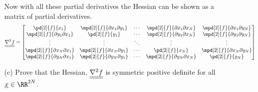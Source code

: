 \documentclass[11pt, oneside]{article}
\begin{document}
\begin{enumerate}
\begin{enumerate}
        Now with all these partial derivatives the Hessian can be shown as a
        matrix of partial derivatives.
        \begin{align*}
          \M{\nabla^2 f} =
          \begin{bmatrix}
            \pd[2]{f}{x_1} & \mpd[2]{f}{\partial x_1 \partial y_1} & \cdots & \mpd[2]{f}{\partial x_1 \partial x_N} & \mpd[2]{f}{\partial x_1 \partial y_N} \\
            \mpd[2]{f}{\partial y_1 \partial x_1} & \pd[2]{f}{y_1} & \cdots & \mpd[2]{f}{\partial y_1 \partial x_N} & \mpd[2]{f}{\partial y_1 \partial y_N} \\
            \vdots & \vdots & \ddots & \vdots & \vdots \\
            \mpd[2]{f}{\partial x_N \partial x_1} & \mpd[2]{f}{\partial x_N \partial y_1} & \cdots &  \pd[2]{f}{x_N} & \mpd[2]{f}{\partial x_N \partial y_N} \\
            \mpd[2]{f}{\partial y_N \partial x_1} & \mpd[2]{f}{\partial y_N \partial y_1} & \cdots &  \mpd[2]{f}{\partial y_N \partial x_N} & \pd[2]{f}{y_N} \\
          \end{bmatrix}
        \end{align*}

      \item[(c)] %
        Prove that the Hessian, $\underline{\underline{\nabla^2 f}}$ is symmetric positive definite
        for all $\v{x} \in \RR^{2N}$.


\end{enumerate}
\end{enumerate}
\end{document}

